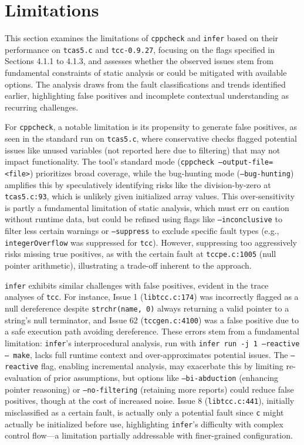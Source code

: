\documentclass[conference]{IEEEtran}
\begin{document}
\section{Limitations}
This section examines the limitations of \texttt{cppcheck} and \texttt{infer} based on their performance on \texttt{tcas5.c} and \texttt{tcc-0.9.27}, focusing on the flags specified in Sections 4.1.1 to 4.1.3, and assesses whether the observed issues stem from fundamental constraints of static analysis or could be mitigated with available options. The analysis draws from the fault classifications and trends identified earlier, highlighting false positives and incomplete contextual understanding as recurring challenges.

For \texttt{cppcheck}, a notable limitation is its propensity to generate false positives, as seen in the standard run on \texttt{tcas5.c}, where conservative checks flagged potential issues like unused variables (not reported here due to filtering) that may not impact functionality. The tool’s standard mode (\texttt{cppcheck --output-file=<file>}) prioritizes broad coverage, while the bug-hunting mode (\texttt{--bug-hunting}) amplifies this by speculatively identifying risks like the division-by-zero at \texttt{tcas5.c:93}, which is unlikely given initialized array values. This over-sensitivity is partly a fundamental limitation of static analysis, which must err on caution without runtime data, but could be refined using flags like \texttt{--inconclusive} to filter less certain warnings or \texttt{--suppress} to exclude specific fault types (e.g., \texttt{integerOverflow} was suppressed for \texttt{tcc}). However, suppressing too aggressively risks missing true positives, as with the certain fault at \texttt{tccpe.c:1005} (null pointer arithmetic), illustrating a trade-off inherent to the approach.

\texttt{infer} exhibits similar challenges with false positives, evident in the trace analyses of \texttt{tcc}. For instance, Issue 1 (\texttt{libtcc.c:174}) was incorrectly flagged as a null dereference despite \texttt{strchr(name, 0)} always returning a valid pointer to a string’s null terminator, and Issue 62 (\texttt{tccgen.c:4100}) was a false positive due to a safe execution path avoiding dereference. These errors stem from a fundamental limitation: \texttt{infer}’s interprocedural analysis, run with \texttt{infer run -j 1 --reactive -- make}, lacks full runtime context and over-approximates potential issues. The \texttt{--reactive} flag, enabling incremental analysis, may exacerbate this by limiting re-evaluation of prior assumptions, but options like \texttt{--bi-abduction} (enhancing pointer reasoning) or \texttt{--no-filtering} (retaining more reports) could reduce false positives, though at the cost of increased noise. Issue 8 (\texttt{libtcc.c:441}), initially misclassified as a certain fault, is actually only a potential fault since \texttt{c} might actually be initialized before use, highlighting \texttt{infer}’s difficulty with complex control flow—a limitation partially addressable with finer-grained configuration.
\end{document}
